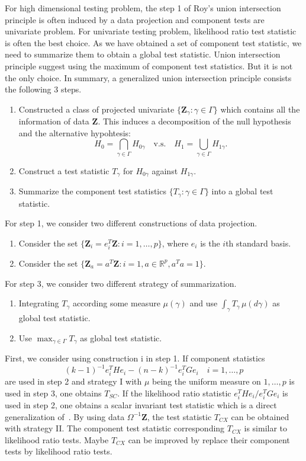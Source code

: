 \documentclass[12pt]{article} %
\newcommand{\bZ}{\mathbf{Z}}
\theoremstyle{definition}
\begin{document}
For high dimensional testing problem, the step 1 of Roy's union intersection principle is often induced by a data projection and component tests are univariate problem.
For univariate testing problem, likelihood ratio test statistic is often the best choice.
As we have obtained a set of component test statistic, we need to summarize them to obtain a global test statistic.
Union intersection principle suggest using the maximum of component test statistics.
But it is not the only choice.
In summary, a generalized union intersection principle consists the following 3 steps.
\begin{enumerate}
    \item
       Constructed a class of projected univariate $\{\bZ_{\gamma}:\gamma\in\Gamma\}$ which contains all the information of data $\bZ$.
        This induces a decomposition of the null hypothesis and the alternative hypohtesis:
        $$
        H_0=\bigcap_{\gamma\in\Gamma} H_{0\gamma} \quad \text{v.s.} \quad 
        H_1=\bigcup_{\gamma\in \Gamma} H_{1\gamma}.
        $$
    \item
        Construct a test statistic $T_\gamma$ for $H_{0\gamma}$ against $H_{1\gamma}$.
    \item
        Summarize the component test statistics $\{T_{\gamma}:\gamma\in\Gamma\}$ into a global test statistic.
\end{enumerate}
For step 1, we consider two different constructions of data projection.
\begin{enumerate}[i]
    \item
        Consider the set $\{\bZ_{i}=e_i^T \bZ:i=1,\ldots,p\}$, where $e_i$ is the $i$th standard basis.
\item
    Consider the set $\{\bZ_{a}=a^T \bZ:i=1,a\in\mathbb{R}^p, a^T a=1\}$.
\end{enumerate}
For step 3, we consider two different strategy of summarization.
\begin{enumerate}[I]
    \item
        Integrating $T_\gamma$ according some measure $\mu(\gamma)$ and use $\int_\gamma T_{\gamma}\,\mu(d\gamma)$ as global test statistic.
\item
    Use $\max_{\gamma\in\Gamma}T_\gamma$ as global test statistic.
\end{enumerate}

First, we consider using construction i in step 1.
If component statistics 
$${(k-1)^{-1}} e_i^T H e_i-(n-k)^{-1}e_i^T G e_i\quad i=1,\ldots, p$$
are used in step 2 and strategy I with $\mu$ being the uniform measure on $1,\ldots,p$ is used in step 3, one obtains $T_{SC}$.
If the likelihood ratio statistic $e_i^T H e_i/e_i^T G e_i$ is used in step 2, one obtains a scalar invariant test statistic which is a direct generalization of~\citet{Srivastava2009A}.
By using data $\Omega^{-1}\bZ$, the test statistic $T_{CX}$ can be obtained with strategy II.
The component test statistic corresponding $T_{CX}$ is similar to likelihood ratio tests.
Maybe $T_{CX}$ can be improved by replace their component tests by likelihood ratio tests.
\end{document}
